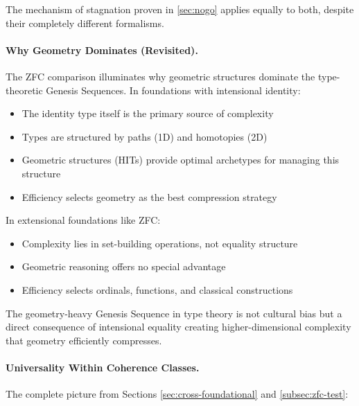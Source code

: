 \documentclass[11pt]{article}
\theoremstyle{definition}
\theoremstyle{remark}
\begin{document}
The mechanism of stagnation proven in \cref{sec:nogo} applies equally to both, despite their completely different formalisms.

\paragraph{Why Geometry Dominates (Revisited).}

The ZFC comparison illuminates why geometric structures dominate the type-theoretic Genesis Sequences. In foundations with intensional identity:
\begin{itemize}
\item The identity type itself is the primary source of complexity
\item Types are structured by paths (1D) and homotopies (2D)
\item Geometric structures (HITs) provide optimal archetypes for managing this structure
\item Efficiency selects geometry as the best compression strategy
\end{itemize}

In extensional foundations like ZFC:
\begin{itemize}
\item Complexity lies in set-building operations, not equality structure
\item Geometric reasoning offers no special advantage
\item Efficiency selects ordinals, functions, and classical constructions
\end{itemize}

The geometry-heavy Genesis Sequence in type theory is not cultural bias but a direct consequence of intensional equality creating higher-dimensional complexity that geometry efficiently compresses.

\paragraph{Universality Within Coherence Classes.}

The complete picture from Sections \ref{sec:cross-foundational} and \ref{subsec:zfc-test}:
\end{document}
